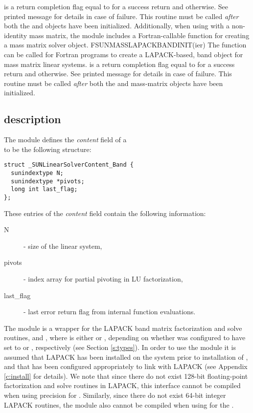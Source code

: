 {
   is a return completion flag equal to  for a success
  return and  otherwise. See printed message for details in case
  of failure.
}
{
  This routine must be
  called \emph{after} both the {\nvector} and {\sunmatrix} objects have
  been initialized.
}
Additionally, when using {\arkode} with a non-identity
mass matrix, the {\sunlinsollapband} module includes a Fortran-callable
function for creating a  mass matrix solver
object.
{
  FSUNMASSLAPACKBANDINIT(ier)
}
{
  The function  can be called for Fortran programs
  to create a LAPACK-based, band  object for mass
  matrix linear systems.
}
{
}
{
   is a  return completion flag equal to  for a success
  return and  otherwise. See printed message for details in case
  of failure.
}
{
  This routine must be
  called \emph{after} both the {\nvector} and {\sunmatrix} mass-matrix
  objects have been initialized.
}


\subsection{{\sunlinsollapband} description}\label{ss:sunlinsol_lapband_description}


The {\sunlinsollapband} module defines the {\em
content} field of a\\
\noindent{} to be the following structure:
\begin{verbatim} 
struct _SUNLinearSolverContent_Band {
  sunindextype N;
  sunindextype *pivots;
  long int last_flag;
};
\end{verbatim}
These entries of the \emph{content} field contain the following
information:
\begin{description}
  \item[N] - size of the linear system,
  \item[pivots] - index array for partial pivoting in LU factorization,
  \item[last\_flag] - last error return flag from internal function evaluations.
\end{description}

{\warn} The {\sunlinsollapband} module is a {\sunlinsol} wrapper for
the LAPACK band matrix factorization and solve routines, 
and , where \id{*} is either  or , depending on
whether {\sundials} was configured to have  set to
 or , respectively (see Section \ref{s:types}).
In order to use the {\sunlinsollapband} module it is assumed
that LAPACK has been installed on the system prior to installation of
{\sundials}, and that {\sundials} has been configured appropriately to
link with LAPACK (see Appendix \ref{c:install} for details).  We note
that since there do not exist 128-bit floating-point factorization and
solve routines in LAPACK, this interface cannot be compiled when
using  precision for .  Similarly, since
there do not exist 64-bit integer LAPACK routines, the
{\sunlinsollapband} module also cannot be compiled when using 
 for the .

